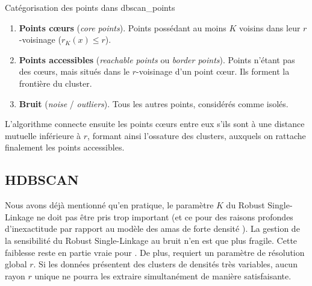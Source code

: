\begin{Definition}{Catégorisation des points dans \DBSCAN \cite{DBSCAN}}{dbscan_points}
\begin{enumerate}
    \item \textbf{Points cœurs} (\emph{core points}). Points possédant au moins $K$ voisins dans leur $r$-voisinage ($r_{K}(x) \le r$).
    \item \textbf{Points accessibles} (\emph{reachable points} ou \emph{border points}). Points n'étant pas des cœurs, mais situés dans le $r$-voisinage d'un point cœur. Ils forment la frontière du cluster.
    \item \textbf{Bruit} (\emph{noise} / \emph{outliers}). Tous les autres points, considérés comme isolés.
\end{enumerate}
\end{Definition}

L'algorithme connecte ensuite les points cœurs entre eux s'ils sont à une distance mutuelle inférieure à $r$, formant ainsi l'ossature des clusters, auxquels on rattache finalement les points accessibles.


\subsection{HDBSCAN}

Nous avons déjà mentionné qu'en pratique, le paramètre $K$ du Robust Single-Linkage ne doit pas être pris trop important (et ce pour des raisons profondes d'inexactitude par rapport au modèle des amas de forte densité \KNN).
La gestion de la sensibilité du Robust Single-Linkage au bruit n'en est que plus fragile.
Cette faiblesse reste en partie vraie pour \DBSCAN. De plus, \DBSCAN requiert un paramètre de résolution global $r$. Si les données présentent des clusters de densités très variables, aucun rayon $r$ unique ne pourra les extraire simultanément de manière satisfaisante.

